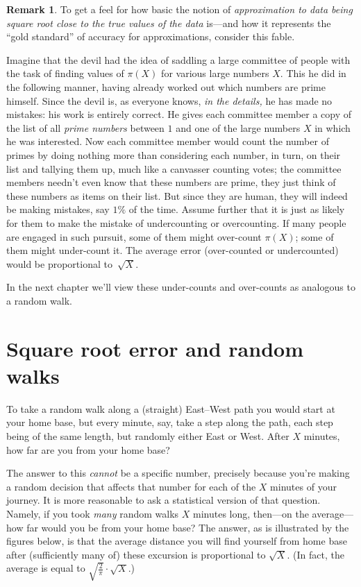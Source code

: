 \documentclass[openany]{book}
\theoremstyle{plain}
\theoremstyle{definition}
\newtheorem{remark}[theorem]{Remark}
\begin{document}
\begin{remark}
  To get a feel for how basic the notion of {\em approximation to data
    being square root close to the true values of the data} is---and
  how it represents the ``gold standard'' of accuracy for
  approximations, consider this fable.

  Imagine that the devil had the idea of saddling a large committee of
  people with the task of finding values of $\pi(X)$ for various large
  numbers $X$.  This he did in the following manner, having already
  worked out which numbers are prime himself. Since the devil is, as
  everyone knows, {\em in the details,} he has made no mistakes: his
  work is entirely correct.  He gives each committee member a copy of
  the list of all {\em prime numbers} between $1$ and one of the large
  numbers $X$ in which he was interested.  Now each committee member
  would count the number of primes by doing nothing more than
  considering each number, in turn, on their list and tallying them
  up, much like a canvasser counting votes; the committee members  needn't even know that these numbers are prime, they just think of these numbers as items on their list. But since they are human,
  they will indeed be making mistakes, say $1\%$ of the time.
  Assume further that it is just as likely for them to make the
  mistake of undercounting or overcounting.  If many people are
  engaged in such pursuit, some of them might over-count $\pi(X)$;
  some of them might under-count it. The average error (over-counted
  or undercounted) would be proportional to~${\sqrt X}$.

  In the next chapter we'll view these under-counts and over-counts as analogous to a random walk.


\end{remark}


\chapter{Square root error and random walks}

 To take a random walk along a (straight) East--West path  you would start at your home base, but every minute, say, take a step along the path, each step being of the same length, but randomly either East or West. After $X$ minutes, how far are you from your home base?

  The answer to this {\it cannot} be a specific number, precisely because you're making a random decision that affects that number for each of the $X$ minutes of your journey. It is more reasonable to ask a statistical version of that question. Namely, if you took {\it many} random walks $X$ minutes long, then---on the average---how far would you be from your home base?  The answer, as is illustrated by the figures below, is that the average distance you will find yourself from home base after (sufficiently many of) these excursion is proportional to ${\sqrt X}$. (In fact, the average is equal to $\sqrt{\frac{2}{\pi}}\cdot {\sqrt X}$.)
\end{document}

